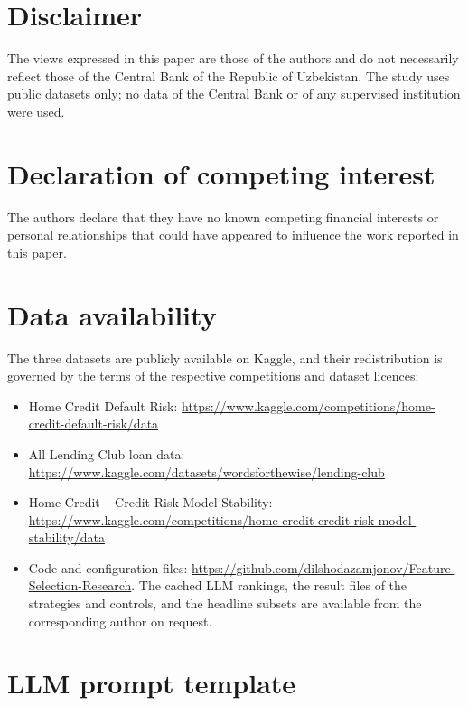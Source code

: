 \documentclass[final,5p,twocolumn]{elsarticle}
\begin{document}
\section*{Disclaimer}
The views expressed in this paper are those of the authors and do not necessarily reflect those of the Central Bank of the Republic of Uzbekistan. The study uses public datasets only; no data of the Central Bank or of any supervised institution were used.

\section*{Declaration of competing interest}
The authors declare that they have no known competing financial interests or personal relationships that could have appeared to influence the work reported in this paper.

\section*{Data availability}
The three datasets are publicly available on Kaggle, and their redistribution is governed by the terms of the respective competitions and dataset licences:
\begin{itemize}
    \item Home Credit Default Risk: \url{https://www.kaggle.com/competitions/home-credit-default-risk/data}
    \item All Lending Club loan data: \url{https://www.kaggle.com/datasets/wordsforthewise/lending-club}
    \item Home Credit -- Credit Risk Model Stability: \url{https://www.kaggle.com/competitions/home-credit-credit-risk-model-stability/data}
    \item Code and configuration files: \url{https://github.com/dilshodazamjonov/Feature-Selection-Research}. The cached LLM rankings, the result files of the strategies and controls, and the headline subsets are available from the corresponding author on request.
\end{itemize}

\appendix
\section{LLM prompt template}
\label{app:prompts}
\end{document}
